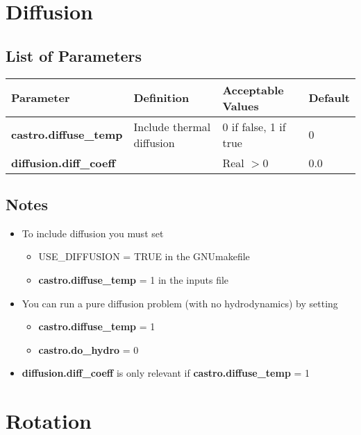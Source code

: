 \section{Diffusion}

\subsection{List of Parameters}

\begin{table*}[h]
\begin{scriptsize}
\begin{center}
\begin{tabular}{|l|l|l|l|} \hline
Parameter & Definition & Acceptable Values &Default\\
\hline
{\bf castro.diffuse\_temp} & Include thermal diffusion & 0 if false, 1 if true & 0 \\
{\bf diffusion.diff\_coeff} & & Real $> 0$ & 0.0 \\
\hline
\end{tabular}
\label{Table:Diffusion}
\end{center}
\end{scriptsize}
\end{table*}

\subsection{Notes}
\begin{itemize}
\item To include diffusion you must set
\begin{itemize}
\item USE\_DIFFUSION  = TRUE in the GNUmakefile
\item {\bf castro.diffuse\_temp} = 1 in the inputs file
\end{itemize}
\item You can run a pure diffusion problem (with no hydrodynamics) by setting 
\begin{itemize}
\item {\bf castro.diffuse\_temp} = 1
\item {\bf castro.do\_hydro} = 0 
\end{itemize}
\item {\bf diffusion.diff\_coeff} is only relevant if {\bf castro.diffuse\_temp} = 1 
\end{itemize}

\section{Rotation}


